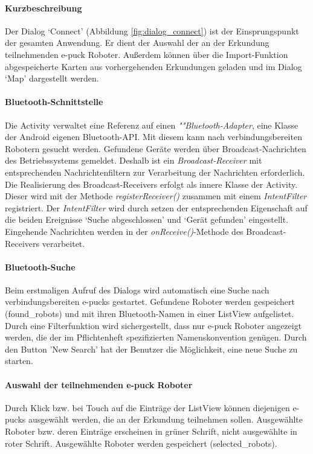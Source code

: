 \documentclass[10pt,a4paper]{article}
\begin{document}
	\paragraph*{Kurzbeschreibung} Der Dialog `Connect' (Abbildung \ref{fig:dialog_connect}) ist der Einsprungspunkt der gesamten Anwendung. Er dient der 
	Auswahl der an der Erkundung teilnehmenden e-puck Roboter. Außerdem können über die Import-Funktion abgespeicherte Karten aus vorhergehenden
	Erkundungen geladen und im Dialog `Map' dargestellt werden.
	
	\paragraph*{Bluetooth-Schnittstelle} Die Activity verwaltet eine Referenz auf einen \textit{""Blue\-tooth-A\-dap\-ter}, eine Klasse der Android
	eigenen Bluetooth-API. Mit diesem kann nach verbindungsbereiten Robotern gesucht werden. Gefundene Geräte werden über Broadcast-Nachrichten des
	Betriebssystems gemeldet. Deshalb ist ein \textit{Broadcast-Receiver} mit entsprechenden Nachrichtenfiltern zur Verarbeitung der Nachrichten
	erforderlich.
	Die Realisierung des Broadcast-Receivers erfolgt als innere Klasse der Activity. Dieser wird mit der Methode \textit{registerReceiver()} zusammen
	mit einem \textit{IntentFilter} registriert.
	Der \textit{IntentFilter} wird durch setzen der entsprechenden Eigenschaft auf die beiden Ereignisse `Suche abgeschlossen' und `Gerät gefunden'
	eingestellt. Eingehende Nachrichten werden in der \textit{onReceive()}-Methode des Broadcast-Receivers verarbeitet.
	
	\paragraph*{Bluetooth-Suche} Beim erstmaligen Aufruf des Dialogs wird automatisch eine Suche nach verbindungsbereiten e-pucks gestartet. 
	Gefundene Roboter werden gespeichert (found\_robots) und mit ihren Bluetooth-Namen in einer ListView aufgelistet. Durch eine 
	Filterfunktion wird sichergestellt, dass nur e-puck Roboter angezeigt werden, die der im Pflichtenheft spezifizierten Namenskonvention genügen.
	Durch den Button 'New Search' hat der Benutzer die Möglichkeit, eine neue Suche zu starten. 
	
	\paragraph*{Auswahl der teilnehmenden e-puck Roboter} Durch Klick bzw. bei Touch auf die Einträge der ListView können diejenigen e-pucks
	ausgewählt werden, die an der Erkundung teilnehmen sollen. Ausgewählte Roboter bzw. deren Einträge erscheinen in grüner Schrift, nicht
	ausgewählte in roter Schrift. Ausgewählte Roboter werden gespeichert (selected\_robots).
	
\end{document}
